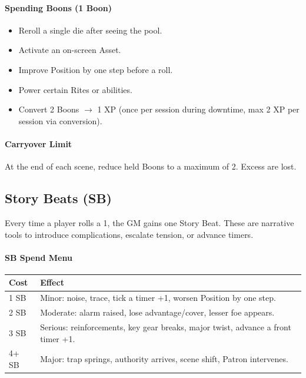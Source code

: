 \paragraph{Spending Boons (1 Boon)}
\begin{itemize}
    \item Reroll a single die after seeing the pool.
    \item Activate an on-screen Asset.
    \item Improve Position by one step before a roll.
    \item Power certain Rites or abilities.
    \item Convert 2 Boons $\rightarrow$ 1 XP (once per session during downtime,
        max 2 XP per session via conversion).
\end{itemize}

\paragraph{Carryover Limit} At the end of each scene, reduce held Boons to a
maximum of 2. Excess are lost.

\subsection{Story Beats (SB)}\label{subsec:story_beats}

Every time a player rolls a 1, the GM gains one Story Beat. These are narrative
tools to introduce complications, escalate tension, or advance timers.

\paragraph{SB Spend Menu}\label{sec:sb_spend_menu}
\begin{center}
\begin{tabular}{ll}
\toprule
\textbf{Cost} & \textbf{Effect} \\
\midrule
1 SB & Minor: noise, trace, tick a timer +1, worsen Position by one step. \\
2 SB & Moderate: alarm raised, lose advantage/cover, lesser foe appears. \\
3 SB & Serious: reinforcements, key gear breaks, major twist, advance a front timer +1. \\
4+ SB & Major: trap springs, authority arrives, scene shift, Patron intervenes. \\
\bottomrule
\end{tabular}
\end{center}


